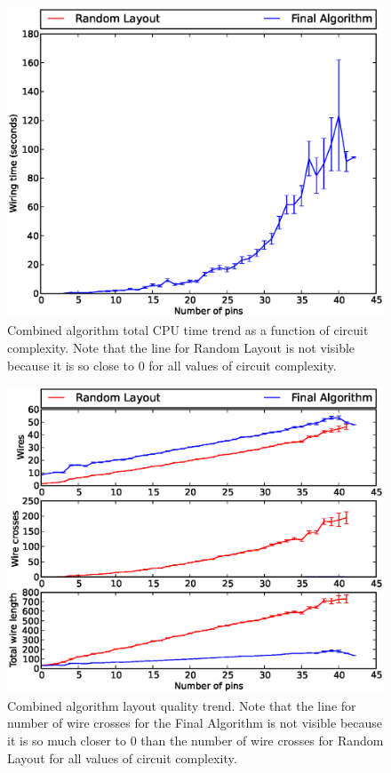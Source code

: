 \begin{figure}[H]
\begin{center}
\includegraphics[width=\textwidth]{Images/final_algorithm_time_trend.eps}
\caption[Combined algorithm time trend]{Combined algorithm total CPU time trend
as a function of circuit complexity. Note that the line for Random Layout is
not visible because it is so close to $0$ for all values of circuit complexity.}
\label{fig:final_time_trend}
\end{center}
\end{figure}

\begin{figure}[H]
\begin{center}
\includegraphics[width=\textwidth]{Images/final_algorithm_quality_trend.eps}
\caption[Combined algorithm layout quality trend]{Combined algorithm layout
quality trend. Note that the line for number of wire crosses for the Final
Algorithm is not visible because it is so much closer to $0$ than the number
of wire crosses for Random Layout for all values of circuit complexity.}
\label{fig:final_quality_trend}
\end{center}
\end{figure}

